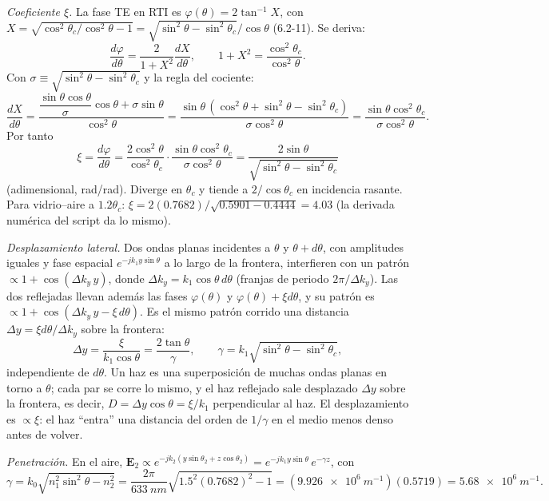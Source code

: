  \emph{Coeficiente $\xi$.} La fase TE en RTI es $\varphi(\theta)=2\tan^{-1}X$, con
$X=\sqrt{\cos^2\theta_c/\cos^2\theta-1}=\sqrt{\sin^2\theta-\sin^2\theta_c}/\cos\theta$ (6.2-11). Se deriva:
\[
\frac{d\varphi}{d\theta}=\frac{2}{1+X^2}\frac{dX}{d\theta},\qquad 1+X^2=\frac{\cos^2\theta_c}{\cos^2\theta}.
\]
Con $\sigma\equiv\sqrt{\sin^2\theta-\sin^2\theta_c}$ y la regla del cociente:
\[
\frac{dX}{d\theta}=\frac{\dfrac{\sin\theta\cos\theta}{\sigma}\cos\theta+\sigma\sin\theta}{\cos^2\theta}
=\frac{\sin\theta\,(\cos^2\theta+\sin^2\theta-\sin^2\theta_c)}{\sigma\cos^2\theta}
=\frac{\sin\theta\cos^2\theta_c}{\sigma\cos^2\theta}.
\]
Por tanto
\[
\boxed{\xi=\frac{d\varphi}{d\theta}=\frac{2\cos^2\theta}{\cos^2\theta_c}\cdot\frac{\sin\theta\cos^2\theta_c}{\sigma\cos^2\theta}
=\frac{2\sin\theta}{\sqrt{\sin^2\theta-\sin^2\theta_c}}}
\]
(adimensional, rad/rad). Diverge en $\theta_c$ y tiende a $2/\cos\theta_c$ en incidencia rasante. Para vidrio--aire a
$1.2\theta_c$: $\xi=2(0.7682)/\sqrt{0.5901-0.4444}=4.03$ (la derivada numérica del script da lo mismo).

\emph{Desplazamiento lateral.} Dos ondas planas incidentes a $\theta$ y $\theta+d\theta$, con
amplitudes iguales y fase espacial $e^{-jk_1y\sin\theta}$ a lo largo de la frontera, interfieren con un patrón
$\propto1+\cos(\Delta k_y\,y)$, donde $\Delta k_y=k_1\cos\theta\,d\theta$ (franjas de periodo
$2\pi/\Delta k_y$). Las dos reflejadas llevan además las fases $\varphi(\theta)$ y
$\varphi(\theta)+\xi d\theta$, y su patrón es $\propto1+\cos(\Delta k_y\,y-\xi\,d\theta)$. Es el mismo
patrón corrido una distancia $\Delta y=\xi d\theta/\Delta k_y$ sobre la frontera:
\[
\Delta y=\frac{\xi}{k_1\cos\theta}=\frac{2\tan\theta}{\gamma},\qquad \gamma=k_1\sqrt{\sin^2\theta-\sin^2\theta_c},
\]
independiente de $d\theta$. Un haz es una superposición de muchas ondas planas en torno a $\theta$; cada par
se corre lo mismo, y el haz reflejado sale desplazado $\Delta y$ sobre la frontera, es decir,
$D=\Delta y\cos\theta=\xi/k_1$ perpendicular al haz. El desplazamiento es $\propto\xi$: el haz ``entra'' una
distancia del orden de $1/\gamma$ en el medio menos denso antes de volver.

\emph{Penetración.} En el aire,
$\mathbf E_2\propto e^{-jk_2(y\sin\theta_2+z\cos\theta_2)}=e^{-jk_1y\sin\theta}\,e^{-\gamma z}$, con
\[
\gamma=k_0\sqrt{n_1^2\sin^2\theta-n_2^2}=\frac{2\pi}{\SI{633}{nm}}\sqrt{1.5^2(0.7682)^2-1}
=(\SI{9.926e6}{m^{-1}})(0.5719)=\SI{5.68e6}{m^{-1}} .
\]

